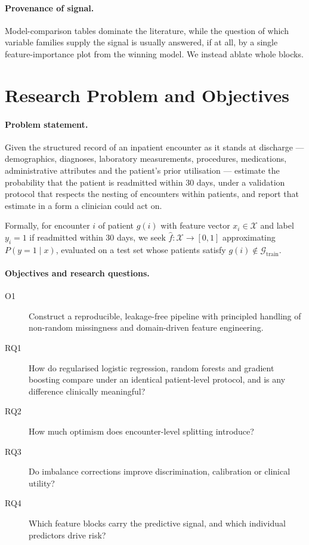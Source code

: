 \documentclass[runningheads]{llncs}
\begin{document}
\paragraph{Provenance of signal.} Model-comparison tables dominate the literature,
while the question of which variable families supply the signal is usually answered,
if at all, by a single feature-importance plot from the winning model. We instead
ablate whole blocks.



\section{Research Problem and Objectives}

\paragraph{Problem statement.} Given the structured record of an inpatient encounter
as it stands at discharge --- demographics, diagnoses, laboratory measurements,
procedures, medications, administrative attributes and the patient's prior utilisation
--- estimate the probability that the patient is readmitted within 30 days, under a
validation protocol that respects the nesting of encounters within patients, and
report that estimate in a form a clinician could act on.

\noindent Formally, for encounter $i$ of patient $g(i)$ with feature vector
$x_i \in \mathcal{X}$ and label $y_i = 1$ if readmitted within 30 days, we seek
$\hat{f}: \mathcal{X} \to [0,1]$ approximating $P(y=1 \mid x)$, evaluated on a test set
whose patients satisfy $g(i) \notin \mathcal{G}_{\text{train}}$.

\paragraph{Objectives and research questions.}
\begin{description}
  \item[O1] Construct a reproducible, leakage-free pipeline with principled handling
    of non-random missingness and domain-driven feature engineering.
  \item[RQ1] How do regularised logistic regression, random forests and gradient
    boosting compare under an identical patient-level protocol, and is any difference
    clinically meaningful?
  \item[RQ2] How much optimism does encounter-level splitting introduce?
  \item[RQ3] Do imbalance corrections improve discrimination, calibration or clinical
    utility?
  \item[RQ4] Which feature blocks carry the predictive signal, and which individual
    predictors drive risk?
\end{description}
\end{document}
